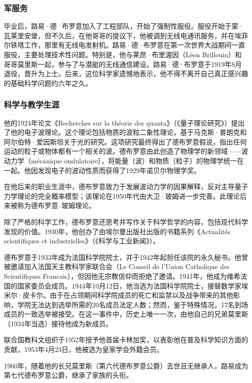 \subsubsection{军服务}
毕业后，路易·德·布罗意加入了工程部队，开始了强制性服役。服役开始于蒙·瓦莱里安堡，但不久后，在他哥哥的提议下，他被调到无线电通讯服务，并在埃菲尔铁塔工作，那里有无线电发射机。路易·德·布罗意在第一次世界大战期间一直服役，主要处理技术性问题。特别是，他与莱昂·布里渥因（Léon Brillouin）和哥哥莫里斯一起，参与了与潜艇的无线通信建设。路易·德·布罗意于1919年8月退役，晋升为上士。后来，这位科学家遗憾地表示，他不得不离开自己真正感兴趣的基础科学问题约六年之久。
\subsubsection{科学与教学生涯}  
他的1924年论文《Recherches sur la théorie des quanta》（《量子理论研究》）提出了他的电子波理论。这个理论包括物质的波粒二象性理论，基于马克斯·普朗克和阿尔伯特·爱因斯坦关于光的研究。这项研究最终得出了德布罗意假说，指出任何运动的粒子或物体都有一个相关的波。德布罗意由此创造了物理学的新领域——波动力学（mécanique ondulatoire），将能量（波）和物质（粒子）的物理学统一在一起。他因发现电子的波动性质而获得了1929年诺贝尔物理学奖。

在他后来的职业生涯中，德布罗意致力于发展波动力学的因果解释，反对主导量子力学理论的完全概率模型；该理论在1950年代由大卫·玻姆进一步完善。此理论后来被称为德布罗意–玻姆理论。

除了严格的科学工作，德布罗意还思考并写作关于科学哲学的内容，包括现代科学发现的价值。1930年，他创办了由埃尔曼出版社出版的书籍系列《Actualités scientifiques et industrielles》（《科学与工业新闻》）。

德布罗意于1933年成为法国科学院院士，并于1942年起担任该院的永久秘书。他曾被邀请加入法国天主教科学家联合会（Le Conseil de l'Union Catholique des Scientifiques Francais），但因他无宗教信仰而拒绝了邀请。1941年，他成为维希法国的国家委员会成员。1944年10月12日，他当选为法国科学院院士，接替数学家埃米尔·皮卡尔。由于在占领期间科学院成员的死亡和监禁以及战争带来的其他影响，学院无法达到选举所需的20名成员法定人数；然而，鉴于特殊情况，17名到场成员的一致选举被接受。在这一事件中，历史上唯一一次，由他自己的兄弟莫里斯（1934年当选）接待他成为新成员。

联合国教科文组织于1952年授予他首届卡林加奖，以表彰他在普及科学知识方面的贡献，1953年4月23日，他被选为皇家学会外籍会员。

1960年，随着他的长兄莫里斯（第六代德布罗意公爵）去世且无继承人，路易成为第七代德布罗意公爵，继承了家族的头衔。

